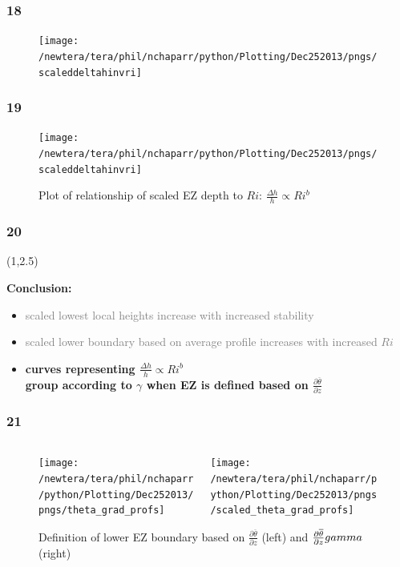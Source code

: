 \documentclass{beamer}
\newcommand\FrameText[1]{
\begin{textblock}{16}(1,2.5)
\raggedright #1
\end{textblock}}
\begin{document}
\begin{frame}
\fontsize{12pt}{7.2}\selectfont
\frametitle{18}
\begin{figure}
\centering
\texttt{[image: /newtera/tera/phil/nchaparr/python/Plotting/Dec252013/pngs/scaleddeltahinvri]}
\end{figure}
\end{frame}

\begin{frame}
\fontsize{12pt}{7.2}\selectfont
\frametitle{19}
\begin{figure}
\centering
\texttt{[image: /newtera/tera/phil/nchaparr/python/Plotting/Dec252013/pngs/scaleddeltahinvri]}
\caption{Plot of relationship of scaled EZ depth to $Ri$: $\frac{\Delta h}{h} \propto Ri ^{b}$}
\end{figure}
\end{frame}

\begin{frame}
\frametitle{20}
\FrameText{\bf{\large Conclusion}:
\vspace{5mm}
\begin{itemize}
\item \textcolor{gray}{scaled lowest local heights increase with increased stability}
\vspace{5mm}
\item \textcolor{gray}{scaled lower boundary based on average profile increases with increased $Ri$} \\
\vspace{5mm}
\item \bf{ \large curves representing  $\frac{\Delta h}{h} \propto Ri ^{b}$}\\
\bf{ \large group according to $\gamma$ when EZ is defined based on $\frac{\partial \overline{\theta}}{\partial z}$}
\end{itemize}
}
\end{frame}

\begin{frame}
\frametitle{21}
\fontsize{12pt}{7.2}\selectfont
\begin{figure}
\begin{columns}[T]
   \begin{column}{.5\textwidth}
   \texttt{[image: /newtera/tera/phil/nchaparr/python/Plotting/Dec252013/pngs/theta\_grad\_profs]} 
   \end{column} 
   
   \begin{column}{.5\textwidth}
    \texttt{[image: /newtera/tera/phil/nchaparr/python/Plotting/Dec252013/pngs/scaled\_theta\_grad\_profs]}
   \end{column}     
\end{columns}
\caption{Definition of lower EZ boundary based on $\frac{\partial \overline{\theta}}{\partial z}$ (left) and $\frac{\partial \overline{\theta}}{\partial z}\/gamma$ (right)}
\end{figure}
\end{frame}
\end{document}
